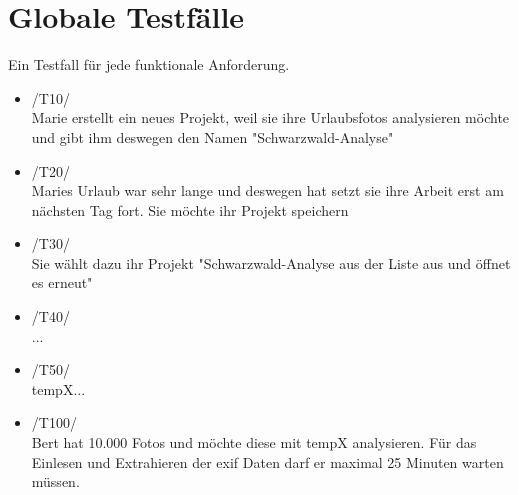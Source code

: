 \section{Globale Testfälle}

Ein Testfall für jede funktionale Anforderung.

\begin{itemize}
	\item /T10/\\ Marie erstellt ein neues Projekt, weil sie ihre Urlaubsfotos analysieren möchte und gibt ihm deswegen den Namen "Schwarzwald-Analyse"
	\item /T20/\\ Maries Urlaub war sehr lange und deswegen hat setzt sie ihre Arbeit erst am nächsten Tag fort. Sie möchte ihr Projekt speichern
	\item /T30/\\  Sie wählt dazu ihr Projekt "Schwarzwald-Analyse aus der Liste aus und öffnet es erneut" 
	\item /T40/\\ ...
	\item /T50/\\ \gls{tempX}...
	\item /T100/\\Bert hat 10.000 Fotos und möchte diese mit \gls{tempX} analysieren. Für das Einlesen und Extrahieren der \gls{exif} Daten darf er maximal 25 Minuten warten müssen.
\end{itemize}